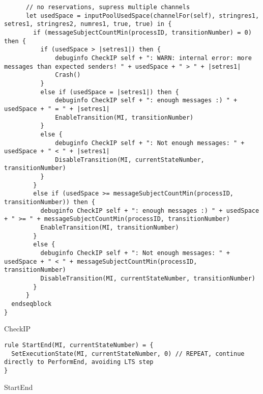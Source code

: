 \begin{listing}[H]
\begin{verbatim}
      // no reservations, supress multiple channels
      let usedSpace = inputPoolUsedSpace(channelFor(self), stringres1, setres1, stringres2, numres1, true, true) in {
        if (messageSubjectCountMin(processID, transitionNumber) = 0) then {
          if (usedSpace > |setres1|) then {
              debuginfo CheckIP self + ": WARN: internal error: more messages than expected senders! " + usedSpace + " > " + |setres1|
              Crash()
          }
          else if (usedSpace = |setres1|) then {
              debuginfo CheckIP self + ": enough messages :) " + usedSpace + " = " + |setres1|
              EnableTransition(MI, transitionNumber)
          }
          else {
              debuginfo CheckIP self + ": Not enough messages: " + usedSpace + " < " + |setres1|
              DisableTransition(MI, currentStateNumber, transitionNumber)
          }
        }
        else if (usedSpace >= messageSubjectCountMin(processID, transitionNumber)) then {
          debuginfo CheckIP self + ": enough messages :) " + usedSpace + " >= " + messageSubjectCountMin(processID, transitionNumber)
          EnableTransition(MI, transitionNumber)
        }
        else {
          debuginfo CheckIP self + ": Not enough messages: " + usedSpace + " < " + messageSubjectCountMin(processID, transitionNumber)
          DisableTransition(MI, currentStateNumber, transitionNumber)
        }
      }
  endseqblock
}
\end{verbatim}
\caption{CheckIP}
\label{lst:asm:CheckIP}
\end{listing}





\begin{listing}[H]
\begin{verbatim}
rule StartEnd(MI, currentStateNumber) = {
  SetExecutionState(MI, currentStateNumber, 0) // REPEAT, continue directly to PerformEnd, avoiding LTS step
}
\end{verbatim}
\caption{StartEnd}
\label{lst:asm:StartEnd}
\end{listing}





